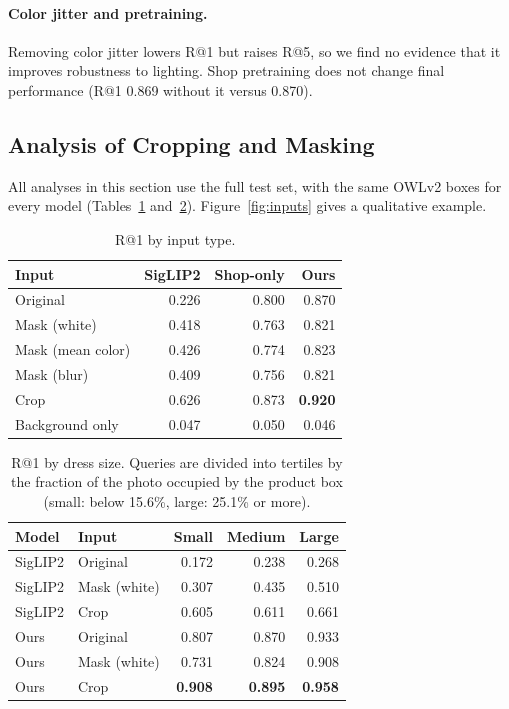 \documentclass[sigconf,nonacm]{acmart}
\begin{document}
\paragraph{Color jitter and pretraining.} Removing color jitter lowers R@1 but raises R@5, so we find no evidence that it improves robustness to lighting. Shop pretraining does not change final performance (R@1 0.869 without it versus 0.870).

\subsection{Analysis of Cropping and Masking}
\label{sec:analysis}

All analyses in this section use the full test set, with the same OWLv2 boxes for every model (Tables~\ref{tab:input} and~\ref{tab:size}). Figure~\ref{fig:inputs} gives a qualitative example.

\begin{table}[t]
  \caption{R@1 by input type.}
  \label{tab:input}
  \small
  \begin{tabular}{lrrr}
    \toprule
    Input & SigLIP2 & Shop-only & Ours \\
    \midrule
    Original & 0.226 & 0.800 & 0.870 \\
    Mask (white) & 0.418 & 0.763 & 0.821 \\
    Mask (mean color) & 0.426 & 0.774 & 0.823 \\
    Mask (blur) & 0.409 & 0.756 & 0.821 \\
    Crop & 0.626 & 0.873 & \textbf{0.920} \\
    Background only & 0.047 & 0.050 & 0.046 \\
    \bottomrule
  \end{tabular}
\end{table}

\begin{table}[t]
  \caption{R@1 by dress size. Queries are divided into tertiles by the fraction of the photo occupied by the product box (small: below 15.6\%, large: 25.1\% or more).}
  \label{tab:size}
  \small
  \setlength{\tabcolsep}{3pt}
  \begin{tabular}{llrrr}
    \toprule
    Model & Input & Small & Medium & Large \\
    \midrule
    SigLIP2 & Original & 0.172 & 0.238 & 0.268 \\
    SigLIP2 & Mask (white) & 0.307 & 0.435 & 0.510 \\
    SigLIP2 & Crop & 0.605 & 0.611 & 0.661 \\
    Ours & Original & 0.807 & 0.870 & 0.933 \\
    Ours & Mask (white) & 0.731 & 0.824 & 0.908 \\
    Ours & Crop & \textbf{0.908} & \textbf{0.895} & \textbf{0.958} \\
    \bottomrule
  \end{tabular}
\end{table}
\end{document}
